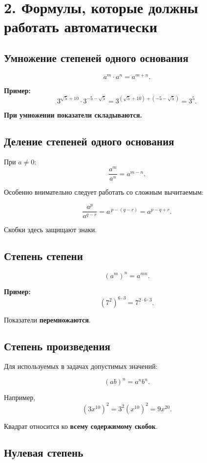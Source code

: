 \documentclass[a4paper,12pt]{article}
\newcommand{\important}[1]{\textcolor{darkaccent}{\textbf{#1}}}
\begin{document}
\section{2. Формулы, которые должны работать автоматически}

\subsection{Умножение степеней одного основания}

\[
a^m\cdot a^n=a^{m+n}.
\]

\textbf{Пример:}
\[
3^{\sqrt5+10}\cdot3^{-5-\sqrt5}
=
3^{(\sqrt5+10)+(-5-\sqrt5)}
=
3^5.
\]

\important{При умножении показатели складываются.}

\subsection{Деление степеней одного основания}

При \(a\neq0\):
\[
\frac{a^m}{a^n}=a^{m-n}.
\]

Особенно внимательно следует работать со сложным вычитаемым:

\[
\frac{a^p}{a^{q-r}}
=
a^{\,p-(q-r)}
=
a^{p-q+r}.
\]

Скобки здесь защищают знаки.

\subsection{Степень степени}

\[
\left(a^m\right)^n=a^{mn}.
\]

\textbf{Пример:}
\[
\left(7^2\right)^{6\cdot3}
=
7^{2\cdot6\cdot3}.
\]

Показатели \important{перемножаются}.

\subsection{Степень произведения}

Для используемых в задачах допустимых значений:

\[
(ab)^n=a^n b^n.
\]

Например,
\[
(3x^{10})^2
=
3^2\left(x^{10}\right)^2
=
9x^{20}.
\]

Квадрат относится ко \important{всему содержимому скобок}.

\subsection{Нулевая степень}
\end{document}
